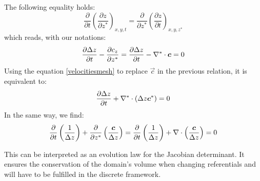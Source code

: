 The following equality holds:
\begin{equation}
\dfrac{\partial}{\partial t}\left(  \dfrac{\partial z}{\partial z^{\ast}%
}\right)_{x,y,t} = \dfrac{\partial}{\partial z^{\ast}}\left(  \dfrac{\partial
z}{\partial t}\right)_{x,y,z^*}
\end{equation}
which reads, with our notations:
\begin{equation}
\dfrac{\partial \Delta z}{\partial t} - \dfrac{\partial c_z}{\partial z^{\ast}}
= \dfrac{\partial \Delta z}{\partial t} - \nabla^* \cdot \bm{c} = 0
\end{equation}
Using the equation \eqref{velocitiesmesh} to replace $\vec{c}$ in the previous relation, it is equivalent to:
\begin{equation}
\dfrac{\partial \Delta z}{\partial t}+\nabla^* \cdot(\Delta z\bm{c}^*)=0
\end{equation}
In the same way, we find:
\begin{equation}
\dfrac{\partial}{\partial t}\left(\dfrac{1}{\Delta z}\right)+\dfrac{\partial}{\partial
z^{\ast}}\left(\dfrac{\bm{c}}{\Delta z}\right)=\dfrac{\partial}{\partial t}\left(\dfrac{1}{\Delta z}\right)+\nabla \cdot\left(\dfrac{\bm{c}}{\Delta z}\right)=0
\end{equation}

This can be interpreted as an evolution law for the Jacobian determinant.
It ensures the conservation of the domain's volume when changing referentials and will have
to be fulfilled in the discrete framework.

